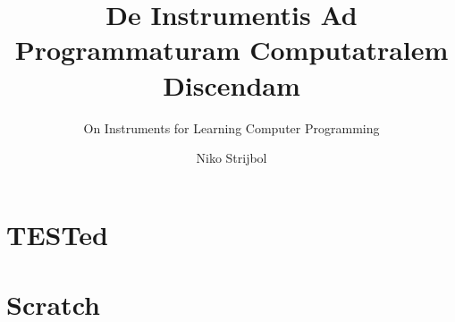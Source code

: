 \documentclass[
    paper=240mm:170mm,
    paper=portrait,
    parskip=half,
    cleardoublepage=plain,
    toc=chapterentrywithdots,
    chapterprefix=true,
    captions=tableheading,
    fontsize=10pt,
    mpinclude=true,
    DIV=13,
    BCOR=10mm
]{scrbook}
\author{Niko Strijbol}
\title{De Instrumentis Ad Programmaturam Computatralem Discendam}
\subtitle{On Instruments for Learning Computer Programming}
\newcommand{\tested}{TESTed}
\begin{document}
\frontmatter

{
    \selectfont\panno
    \maketitle
}



\tableofcontents





\mainmatter

\part{\tested{}}\label{part:tested}




\part{Scratch}\label{part:scratch}



%


\printbibliography[heading=bibintoc]
\end{document}
